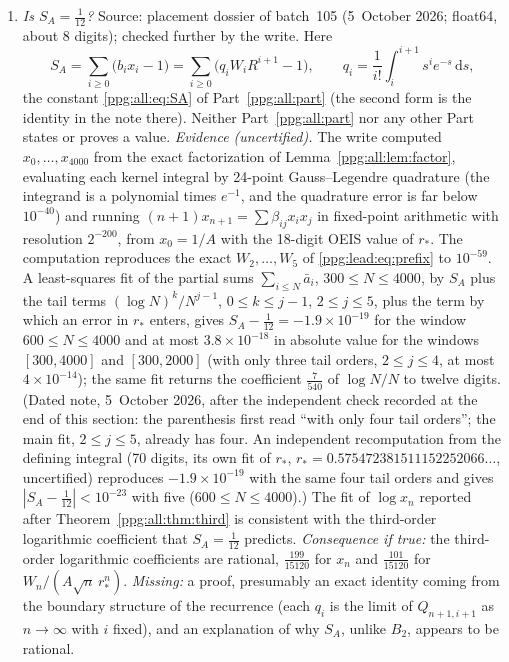 \documentclass[11pt,letterpaper]{article}
\theoremstyle{remark}\newtheorem{remark}[theorem]{Remark}
\numberwithin{equation}{section}
\newcommand{\dd}{\mathrm d}
\begin{document}
\begin{enumerate}[label=\arabic*.,ref=\arabic*]
\item\label{ppg:fq:sa} \emph{Is $S_A=\frac1{12}$?} Source: placement dossier of batch~105 (5~October 2026; float64, about 8 digits); checked further by the write. Here
\[
 S_A=\sum_{i\ge0}\bigl(b_ix_i-1\bigr)=\sum_{i\ge0}\bigl(q_iW_iR^{i+1}-1\bigr),\qquad
 q_i=\frac1{i!}\int_i^{i+1}s^ie^{-s}\,\dd s,
\]
the constant \eqref{ppg:all:eq:SA} of Part~\ref{ppg:all:part} (the second form is the identity in the note there). Neither Part~\ref{ppg:all:part} nor any other Part states or proves a value. \emph{Evidence (uncertified).} The write computed $x_0,\ldots,x_{4000}$ from the exact factorization of Lemma~\ref{ppg:all:lem:factor}, evaluating each kernel integral by 24-point Gauss--Legendre quadrature (the integrand is a polynomial times $e^{-1}$, and the quadrature error is far below $10^{-40}$) and running $(n+1)x_{n+1}=\sum\beta_{ij}x_ix_j$ in fixed-point arithmetic with resolution $2^{-200}$, from $x_0=1/A$ with the 18-digit OEIS value of $r_*$. The computation reproduces the exact $W_2,\ldots,W_5$ of \eqref{ppg:lead:eq:prefix} to $10^{-59}$. A least-squares fit of the partial sums $\sum_{i\le N}\bar a_i$, $300\le N\le4000$, by $S_A$ plus the tail terms $(\log N)^k/N^{j-1}$, $0\le k\le j-1$, $2\le j\le5$, plus the term by which an error in $r_*$ enters, gives $S_A-\frac1{12}=-1.9\times10^{-19}$ for the window $600\le N\le4000$ and at most $3.8\times10^{-18}$ in absolute value for the windows $[300,4000]$ and $[300,2000]$ (with only three tail orders, $2\le j\le4$, at most $4\times10^{-14}$); the same fit returns the coefficient $\frac7{540}$ of $\log N/N$ to twelve digits. (Dated note, 5~October 2026, after the independent check recorded at the end of this section: the parenthesis first read ``with only four tail orders''; the main fit, $2\le j\le5$, already has four. An independent recomputation from the defining integral (70 digits, its own fit of $r_*$, $r_*=0.575472381511152252066\ldots$, uncertified) reproduces $-1.9\times10^{-19}$ with the same four tail orders and gives $|S_A-\frac1{12}|<10^{-23}$ with five ($600\le N\le4000$).) The fit of $\log x_n$ reported after Theorem~\ref{ppg:all:thm:third} is consistent with the third-order logarithmic coefficient that $S_A=\frac1{12}$ predicts. \emph{Consequence if true:} the third-order logarithmic coefficients are rational, $\frac{199}{15120}$ for $x_n$ and $\frac{101}{15120}$ for $W_n/(A\sqrt n\,r_*^n)$. \emph{Missing:} a proof, presumably an exact identity coming from the boundary structure of the recurrence (each $q_i$ is the limit of $Q_{n+1,i+1}$ as $n\to\infty$ with $i$ fixed), and an explanation of why $S_A$, unlike $B_2$, appears to be rational.
\end{enumerate}
\end{document}
